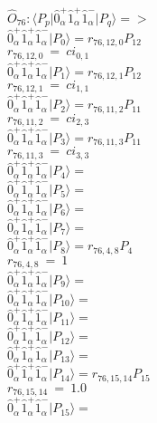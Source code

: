 \documentclass[14pt]{article}
\begin{document}
    $\hat{O}_{76}:  \langle{P_p}\vert \hat{0}_{\alpha}^{+}\hat{1}_{\alpha}^{+}\hat{1}_{\alpha}^{-} \vert{P_q}\rangle => $ \\ 
    $ \hat{0}_{\alpha}^{+}\hat{1}_{\alpha}^{+}\hat{1}_{\alpha}^{-} \vert{P_{0}}\rangle = {r}_{76,12,0}P_{12} $ \\ 
    ${r}_{76,12,0}\ =\ {ci}_{0,1} $ \\ 
    $ \hat{0}_{\alpha}^{+}\hat{1}_{\alpha}^{+}\hat{1}_{\alpha}^{-} \vert{P_{1}}\rangle = {r}_{76,12,1}P_{12} $ \\ 
    ${r}_{76,12,1}\ =\ {ci}_{1,1} $ \\ 
    $ \hat{0}_{\alpha}^{+}\hat{1}_{\alpha}^{+}\hat{1}_{\alpha}^{-} \vert{P_{2}}\rangle = {r}_{76,11,2}P_{11} $ \\ 
    ${r}_{76,11,2}\ =\ {ci}_{2,3} $ \\ 
    $ \hat{0}_{\alpha}^{+}\hat{1}_{\alpha}^{+}\hat{1}_{\alpha}^{-} \vert{P_{3}}\rangle = {r}_{76,11,3}P_{11} $ \\ 
    ${r}_{76,11,3}\ =\ {ci}_{3,3} $ \\ 
    $ \hat{0}_{\alpha}^{+}\hat{1}_{\alpha}^{+}\hat{1}_{\alpha}^{-} \vert{P_{4}}\rangle =  $ \\ 
    $ \hat{0}_{\alpha}^{+}\hat{1}_{\alpha}^{+}\hat{1}_{\alpha}^{-} \vert{P_{5}}\rangle =  $ \\ 
    $ \hat{0}_{\alpha}^{+}\hat{1}_{\alpha}^{+}\hat{1}_{\alpha}^{-} \vert{P_{6}}\rangle =  $ \\ 
    $ \hat{0}_{\alpha}^{+}\hat{1}_{\alpha}^{+}\hat{1}_{\alpha}^{-} \vert{P_{7}}\rangle =  $ \\ 
    $ \hat{0}_{\alpha}^{+}\hat{1}_{\alpha}^{+}\hat{1}_{\alpha}^{-} \vert{P_{8}}\rangle = {r}_{76,4,8}P_{4} $ \\ 
    ${r}_{76,4,8}\ =\ 1 $ \\ 
    $ \hat{0}_{\alpha}^{+}\hat{1}_{\alpha}^{+}\hat{1}_{\alpha}^{-} \vert{P_{9}}\rangle =  $ \\ 
    $ \hat{0}_{\alpha}^{+}\hat{1}_{\alpha}^{+}\hat{1}_{\alpha}^{-} \vert{P_{10}}\rangle =  $ \\ 
    $ \hat{0}_{\alpha}^{+}\hat{1}_{\alpha}^{+}\hat{1}_{\alpha}^{-} \vert{P_{11}}\rangle =  $ \\ 
    $ \hat{0}_{\alpha}^{+}\hat{1}_{\alpha}^{+}\hat{1}_{\alpha}^{-} \vert{P_{12}}\rangle =  $ \\ 
    $ \hat{0}_{\alpha}^{+}\hat{1}_{\alpha}^{+}\hat{1}_{\alpha}^{-} \vert{P_{13}}\rangle =  $ \\ 
    $ \hat{0}_{\alpha}^{+}\hat{1}_{\alpha}^{+}\hat{1}_{\alpha}^{-} \vert{P_{14}}\rangle = {r}_{76,15,14}P_{15} $ \\ 
    ${r}_{76,15,14}\ =\ 1.0 $ \\ 
    $ \hat{0}_{\alpha}^{+}\hat{1}_{\alpha}^{+}\hat{1}_{\alpha}^{-} \vert{P_{15}}\rangle =  $ \\ 
    
\end{document}
